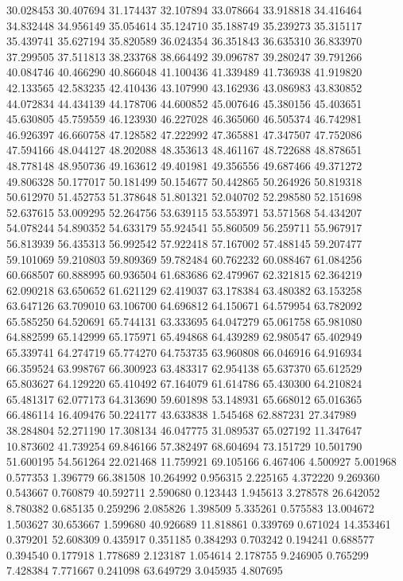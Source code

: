 30.028453
30.407694
31.174437
32.107894
33.078664
33.918818
34.416464
34.832448
34.956149
35.054614
35.124710
35.188749
35.239273
35.315117
35.439741
35.627194
35.820589
36.024354
36.351843
36.635310
36.833970
37.299505
37.511813
38.233768
38.664492
39.096787
39.280247
39.791266
40.084746
40.466290
40.866048
41.100436
41.339489
41.736938
41.919820
42.133565
42.583235
42.410436
43.107990
43.162936
43.086983
43.830852
44.072834
44.434139
44.178706
44.600852
45.007646
45.380156
45.403651
45.630805
45.759559
46.123930
46.227028
46.365060
46.505374
46.742981
46.926397
46.660758
47.128582
47.222992
47.365881
47.347507
47.752086
47.594166
48.044127
48.202088
48.353613
48.461167
48.722688
48.878651
48.778148
48.950736
49.163612
49.401981
49.356556
49.687466
49.371272
49.806328
50.177017
50.181499
50.154677
50.442865
50.264926
50.819318
50.612970
51.452753
51.378648
51.801321
52.040702
52.298580
52.151698
52.637615
53.009295
52.264756
53.639115
53.553971
53.571568
54.434207
54.078244
54.890352
54.633179
55.924541
55.860509
56.259711
55.967917
56.813939
56.435313
56.992542
57.922418
57.167002
57.488145
59.207477
59.101069
59.210803
59.809369
59.782484
60.762232
60.088467
61.084256
60.668507
60.888995
60.936504
61.683686
62.479967
62.321815
62.364219
62.090218
63.650652
61.621129
62.419037
63.178384
63.480382
63.153258
63.647126
63.709010
63.106700
64.696812
64.150671
64.579954
63.782092
65.585250
64.520691
65.744131
63.333695
64.047279
65.061758
65.981080
64.882599
65.142999
65.175971
65.494868
64.439289
62.980547
65.402949
65.339741
64.274719
65.774270
64.753735
63.960808
66.046916
64.916934
66.359524
63.998767
66.300923
63.483317
62.954138
65.637370
65.612529
65.803627
64.129220
65.410492
67.164079
61.614786
65.430300
64.210824
65.481317
62.077173
64.313690
59.601898
53.148931
65.668012
65.016365
66.486114
16.409476
50.224177
43.633838
1.545468
62.887231
27.347989
38.284804
52.271190
17.308134
46.047775
31.089537
65.027192
11.347647
10.873602
41.739254
69.846166
57.382497
68.604694
73.151729
10.501790
51.600195
54.561264
22.021468
11.759921
69.105166
6.467406
4.500927
5.001968
0.577353
1.396779
66.381508
10.264992
0.956315
2.225165
4.372220
9.269360
0.543667
0.760879
40.592711
2.590680
0.123443
1.945613
3.278578
26.642052
8.780382
0.685135
0.259296
2.085826
1.398509
5.335261
0.575583
13.004672
1.503627
30.653667
1.599680
40.926689
11.818861
0.339769
0.671024
14.353461
0.379201
52.608309
0.435917
0.351185
0.384293
0.703242
0.194241
0.688577
0.394540
0.177918
1.778689
2.123187
1.054614
2.178755
9.246905
0.765299
7.428384
7.771667
0.241098
63.649729
3.045935
4.807695
